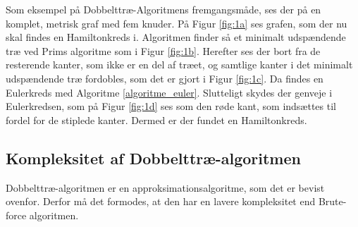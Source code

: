 \begin{figure}[htbp]
\centering
	\begin{minipage}[t]{0.5\textwidth}
		\centering
			\scalebox{0.7}{}
		\label{dtex1}
		\label{fig:1a}
	\end{minipage}%
	\begin{minipage}[t]{0.5\textwidth}
		\centering
			\scalebox{0.7}{}
		\label{dtex2}
		\label{fig:1b}
	\end{minipage}

	\vspace{10mm}

	\begin{minipage}[t]{0.5\textwidth}
		\centering		
			\scalebox{0.7}{}
		\label{dtex3}
		\label{fig:1c}
	\end{minipage}%
	\begin{minipage}[t]{0.5\textwidth}
		\centering
			\scalebox{0.7}{}
		\label{dtex4}
		\label{fig:1d}
	\end{minipage}

	\vspace{5mm}

	\caption{} \label{fig:1}
\end{figure}

\begin{exmp}
	Som eksempel på Dobbelttræ-Algoritmens fremgangsmåde, ses der på en komplet, metrisk graf med fem knuder.
På Figur \ref{fig:1a} ses grafen, som der nu skal findes en Hamiltonkreds i.
	Algoritmen finder så et minimalt udspændende træ ved Prims algoritme som i Figur \ref{fig:1b}.
	Herefter ses der bort fra de resterende kanter, som ikke er en del af træet, og samtlige kanter i det minimalt udspændende træ fordobles, som det er gjort i Figur \ref{fig:1c}.
	Da findes en Eulerkreds med Algoritme \ref{algoritme_euler}.
	Slutteligt skydes der genveje i Eulerkredsen, som på Figur \ref{fig:1d} ses som den røde kant, som indsættes til fordel for de stiplede kanter. Dermed er der fundet en Hamiltonkreds.
\end{exmp}

\subsection{Kompleksitet af Dobbelttræ-algoritmen}
Dobbelttræ-algoritmen er en approksimationsalgoritme, som det er bevist ovenfor. Derfor må det formodes, at den har en lavere kompleksitet end Brute-force algoritmen.

